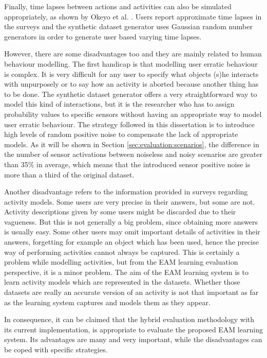 Finally, time lapses between actions and activities can also be simulated appropriately, as shown by Okeyo et al. \cite{Okeyo2012a}. Users report approximate time lapses in the surveys and the synthetic dataset generator uses Gaussian random number generators in order to generate user based varying time lapses. 

However, there are some disadvantages too and they are mainly related to human behaviour modelling. The first handicap is that modelling user erratic behaviour is complex. It is very difficult for any user to specify what objects (s)he interacts with unpurposely or to say how an activity is aborted because another thing has to be done. The synthetic dataset generator offers a very straightforward way to model this kind of interactions, but it is the researcher who has to assign probability values to specific sensors without having an appropriate way to model user erratic behaviour. The strategy followed in this dissertation is to introduce high levels of random positive noise to compensate the lack of appropriate models. As it will be shown in Section \ref{sec:evaluation:scenarios}, the difference in the number of sensor activations between noiseless and noisy scenarios are greater than 35\% in average, which means that the introduced sensor positive noise is more than a third of the original dataset. 

Another disadvantage refers to the information provided in surveys regarding activity models. Some users are very precise in their answers, but some are not. Activity descriptions given by some users might be discarded due to their vagueness. But this is not generally a big problem, since obtaining more answers is usually easy. Some other users may omit important details of activities in their answers, forgetting for example an object which has been used, hence the precise way of performing activities cannot always be captured. This is certainly a problem while modelling activities, but from the EAM learning evaluation perspective, it is a minor problem. The aim of the EAM learning system is to learn activity models which are represented in the datasets. Whether those datasets are really an accurate version of an activity is not that important as far as the learning system captures and models them as they appear.

In consequence, it can be claimed that the hybrid evaluation methodology with its current implementation, is appropriate to evaluate the proposed EAM learning system. Its advantages are many and very important, while the disadvantages can be coped with specific strategies. 

